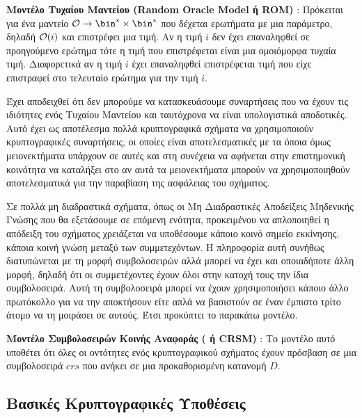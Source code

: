 \begin{definition}
\textbf{Μοντέλο Τυχαίου Μαντείου (Random Oracle Model ή ROM)} : Πρόκειται για ένα μαντείο $\oracle \rightarrow \bin^* \times \bin^*$ που δέχεται ερωτήματα με μια παράμετρο, δηλαδή $\mathcal{O}(i)$ και επιστρέφει μια τιμή. Αν η τιμή $i$ δεν έχει επαναληφθεί σε προηγούμενο ερώτημα τότε η τιμή που επιστρέφεται είναι μια ομοιόμορφα τυχαία τιμή. Διαφορετικά αν η τιμή $i$ έχει επαναληφθεί επιστρέφεται τιμή που είχε επιστραφεί στο τελευταίο ερώτημα για την τιμή $i$.
\end{definition}

Έχει αποδειχθεί ότι δεν μπορούμε να κατασκευάσουμε συναρτήσεις που να έχουν τις ιδιότητες ενός Τυχαίου Μαντείου και ταυτόχρονα να είναι υπολογιστικά αποδοτικές. Αυτό έχει ως αποτέλεσμα πολλά κρυπτογραφικά σχήματα να χρησιμοποιούν κρυπτογραφικές συναρτήσεις, οι οποίες είναι αποτελεσματικές με τα όποια όμως μειονεκτήματα υπάρχουν σε αυτές και στη συνέχεια να αφήνεται στην επιστημονική κοινότητα να καταλήξει στο αν αυτά τα μειονεκτήματα μπορούν να χρησιμοποιηθούν αποτελεσματικά για την παραβίαση της ασφάλειας του σχήματος.

Σε πολλά μη διαδραστικά σχήματα, όπως οι Μη Διαδραστικές Αποδείξεις Μηδενικής Γνώσης που θα εξετάσουμε σε επόμενη ενότητα, προκειμένου να απλοποιηθεί η απόδειξη του σχήματος χρειάζεται να υποθέσουμε κάποιο κοινό σημείο εκκίνησης, κάποια κοινή γνώση μεταξύ των συμμετεχόντων. Η πληροφορία αυτή συνήθως διατυπώνεται με τη μορφή συμβολοσειρών αλλά μπορεί να έχει και οποιαδήποτε άλλη μορφή, δηλαδή ότι οι συμμετέχοντες έχουν όλοι στην κατοχή τους την ίδια συμβολοσειρά. Αυτή τη συμβολοσειρά μπορεί να έχουν χρησιμοποιήσει κάποιο άλλο πρωτόκολλο για να την αποκτήσουν είτε απλά να βασιστούν σε έναν έμπιστο τρίτο άτομο να τη μοιράσει σε αυτούς. Έτσι προκύπτει το παρακάτω μοντέλο.

\begin{definition}
\textbf{Μοντέλο Συμβολοσειρών Κοινής Αναφοράς ( ή CRSM)} : Το μοντέλο αυτό υποθέτει ότι όλες οι οντότητες ενός κρυπτογραφικού σχήματος έχουν πρόσβαση σε μια συμβολοσειρά $crs$ που ανήκει σε μια προκαθορισμένη κατανομή $D$.
\end{definition}

\subsection{Βασικές Κρυπτογραφικές Υποθέσεις}

